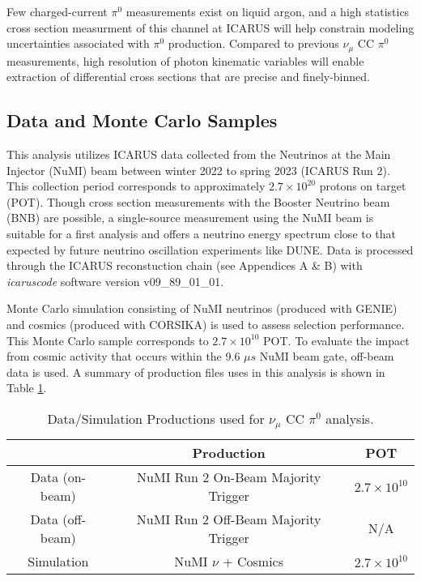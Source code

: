 \documentclass[../main.tex]{subfiles}
\begin{document}
Few charged-current $\pi^{0}$ measurements exist on liquid argon, and a high statistics cross section measurment of this channel at ICARUS will help constrain modeling uncertainties associated with $\pi^{0}$ production.  Compared to previous $\nu_{\mu}$ CC $\pi^{0}$ measurements, high resolution of photon kinematic variables will enable extraction of differential cross sections that are precise and finely-binned.

\subsection{Data and Monte Carlo Samples}
This analysis utilizes ICARUS data collected from the Neutrinos at the Main Injector (NuMI) beam between winter 2022 to spring 2023 (ICARUS Run 2). This collection period corresponds to approximately $2.7 \times 10^{20}$ protons on target (POT).  Though cross section measurements with the Booster Neutrino beam (BNB) are possible, a single-source measurement using the NuMI beam is suitable for a first analysis and offers a neutrino energy spectrum close to that expected by future neutrino oscillation experiments like DUNE.  Data is processed through the ICARUS reconstuction chain (see Appendices A \& B) with \textit{icaruscode} software version v09\_89\_01\_01.

Monte Carlo simulation consisting of NuMI neutrinos (produced with GENIE) and cosmics (produced with CORSIKA) is used to assess selection performance.  This Monte Carlo sample corresponds to $2.7 \times 10^{10}$ POT.  To evaluate the impact from cosmic activity that occurs within the 9.6 $\mu s$ NuMI beam gate, off-beam data is used.  A summary of production files uses in this analysis is shown in Table \ref{Tab:prod}.

\begin{table}[ht]
    \caption{Data/Simulation Productions used for $\nu_{\mu}$ CC $\pi^{0}$ analysis.}
    \vspace{0.1cm}
    \centering
    \begin{tabular}{ c c c } 
    \hline
      &  Production & POT  \\
    \hline
    Data (on-beam) & NuMI Run 2 On-Beam Majority Trigger & $2.7 \times 10^{10}$ \\ 
    Data (off-beam) & NuMI Run 2 Off-Beam Majority Trigger & N/A \\
    Simulation & NuMI $\nu$ + Cosmics & $2.7 \times 10^{10}$ \\ 
    \hline
    \end{tabular}
    \label{Tab:prod}
\end{table}
\end{document}

